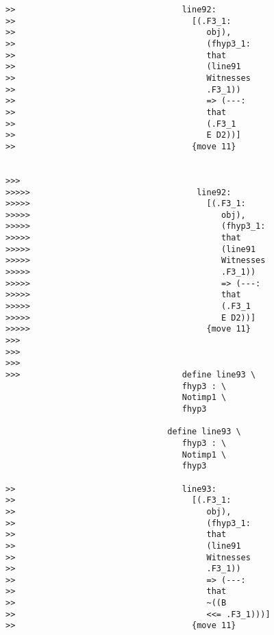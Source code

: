 \documentclass[12pt]{article}
\begin{document}
\begin{verbatim}
>>                                  line92:
>>                                    [(.F3_1:
>>                                       obj),
>>                                       (fhyp3_1:
>>                                       that
>>                                       (line91
>>                                       Witnesses
>>                                       .F3_1))
>>                                       => (---:
>>                                       that
>>                                       (.F3_1
>>                                       E D2))]
>>                                    {move 11}


>>>
>>>>>                                  line92:
>>>>>                                    [(.F3_1:
>>>>>                                       obj),
>>>>>                                       (fhyp3_1:
>>>>>                                       that
>>>>>                                       (line91
>>>>>                                       Witnesses
>>>>>                                       .F3_1))
>>>>>                                       => (---:
>>>>>                                       that
>>>>>                                       (.F3_1
>>>>>                                       E D2))]
>>>>>                                    {move 11}
>>>
>>>
>>>
>>>                                 define line93 \
                                    fhyp3 : \
                                    Notimp1 \
                                    fhyp3

                                 define line93 \
                                    fhyp3 : \
                                    Notimp1 \
                                    fhyp3

>>                                  line93:
>>                                    [(.F3_1:
>>                                       obj),
>>                                       (fhyp3_1:
>>                                       that
>>                                       (line91
>>                                       Witnesses
>>                                       .F3_1))
>>                                       => (---:
>>                                       that
>>                                       ~((B
>>                                       <<= .F3_1)))]
>>                                    {move 11}



\end{verbatim}
\end{document}
